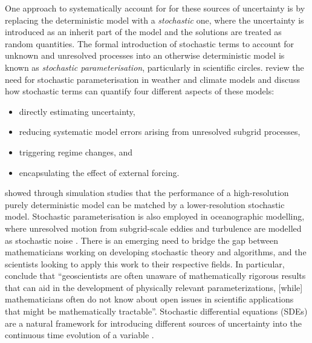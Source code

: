 One approach to systematically account for for these sources of uncertainty is by replacing the deterministic model with a \emph{stochastic} one, where the uncertainty is introduced as an inherit part of the model and the solutions are treated as random quantities.
The formal introduction of stochastic terms to account for unknown and unresolved processes into an otherwise deterministic model is known as \emph{stochastic parameterisation}, particularly in scientific circles.
\citet{BernerEtAl_2017_StochasticParameterizationNew} review the need for stochastic parameterisation in weather and climate models and discuss how stochastic terms can quantify four different aspects of these models:
\begin{itemize}
	\item directly estimating uncertainty,
	\item reducing systematic model errors arising from unresolved subgrid processes,
	\item triggering regime changes, and
	\item encapsulating the effect of external forcing.
\end{itemize}
\citet{DawsonPalmer_2015_SimulatingWeatherRegimes} showed through simulation studies that the performance of a high-resolution purely deterministic model can be matched by a lower-resolution stochastic model.
Stochastic parameterisation is also employed in oceanographic modelling, where unresolved motion from subgrid-scale eddies and turbulence are modelled as stochastic noise \citep{Griffa_1996_ApplicationsStochasticParticle,BerloffMcWilliams_2002_MaterialTransportOceanic}.
There is an emerging need to bridge the gap between mathematicians working on developing stochastic theory and algorithms, and the scientists looking to apply this work to their respective fields.
In particular, \citet{BernerEtAl_2017_StochasticParameterizationNew} conclude that ``geoscientists are often unaware of mathematically rigorous results that can aid in the development of physically relevant parameterizations, [while] mathematicians often do not know about open issues in scientific applications that might be mathematically tractable''.
Stochastic differential equations (SDEs) are a natural framework for introducing different sources of uncertainty into the continuous time evolution of a variable \citep{Oksendal_2003_StochasticDifferentialEquations,SarkkaSolin_2019_AppliedStochasticDifferential,KallianpurSundar_2014_StochasticAnalysisDiffusion}.
